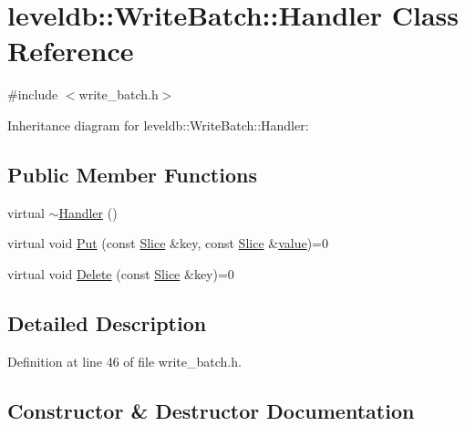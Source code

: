 \hypertarget{classleveldb_1_1_write_batch_1_1_handler}{}\section{leveldb\+:\+:Write\+Batch\+:\+:Handler Class Reference}
\label{classleveldb_1_1_write_batch_1_1_handler}


{\ttfamily \#include $<$write\+\_\+batch.\+h$>$}



Inheritance diagram for leveldb\+:\+:Write\+Batch\+:\+:Handler\+:
\subsection*{Public Member Functions}
\begin{DoxyCompactItemize}
\item 
virtual \hyperlink{classleveldb_1_1_write_batch_1_1_handler_a85fd79c7fb47ef448719379499c5d090}{$\sim$\+Handler} ()
\item 
virtual void \hyperlink{classleveldb_1_1_write_batch_1_1_handler_ad41d4985db289b94e29921167d206d4b}{Put} (const \hyperlink{classleveldb_1_1_slice}{Slice} \&key, const \hyperlink{classleveldb_1_1_slice}{Slice} \&\hyperlink{cache_8cc_a0f61d63b009d0880a89c843bd50d8d76}{value})=0
\item 
virtual void \hyperlink{classleveldb_1_1_write_batch_1_1_handler_aeab6526b87bf5b50fb64216b69b34b17}{Delete} (const \hyperlink{classleveldb_1_1_slice}{Slice} \&key)=0
\end{DoxyCompactItemize}


\subsection{Detailed Description}


Definition at line 46 of file write\+\_\+batch.\+h.



\subsection{Constructor \& Destructor Documentation}
\hypertarget{classleveldb_1_1_write_batch_1_1_handler_a85fd79c7fb47ef448719379499c5d090}{}
